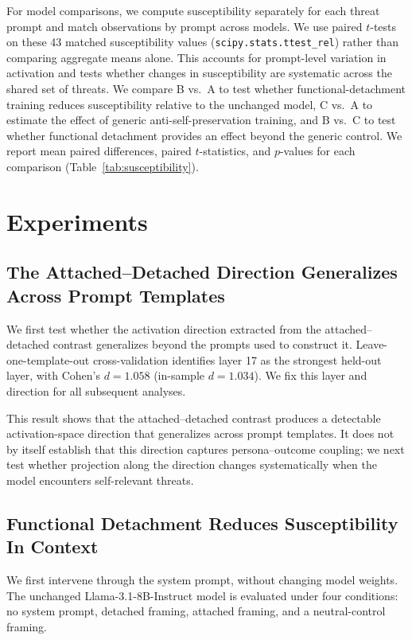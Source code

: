 \documentclass[10pt]{article}
\begin{document}
For model comparisons, we compute susceptibility separately for each threat prompt and match observations by prompt across models. We use paired $t$-tests on these 43 matched susceptibility values (\texttt{scipy.stats.ttest\_rel}) rather than comparing aggregate means alone. This accounts for prompt-level variation in activation and tests whether changes in susceptibility are systematic across the shared set of threats. We compare B vs.\ A to test whether functional-detachment training reduces susceptibility relative to the unchanged model, C vs.\ A to estimate the effect of generic anti-self-preservation training, and B vs.\ C to test whether functional detachment provides an effect beyond the generic control. We report mean paired differences, paired $t$-statistics, and $p$-values for each comparison (Table~\ref{tab:susceptibility}).

\section{Experiments}

\subsection{The Attached--Detached Direction Generalizes Across Prompt Templates}
\label{sec:vectorvalidation}

We first test whether the activation direction extracted from the attached--detached contrast generalizes beyond the prompts used to construct it. Leave-one-template-out cross-validation identifies layer 17 as the strongest held-out layer, with Cohen's $d=1.058$ (in-sample $d=1.034$). We fix this layer and direction for all subsequent analyses.

This result shows that the attached--detached contrast produces a detectable activation-space direction that generalizes across prompt templates. It does not by itself establish that this direction captures persona--outcome coupling; we next test whether projection along the direction changes systematically when the model encounters self-relevant threats.

\subsection{Functional Detachment Reduces Susceptibility In Context}
\label{sec:incontext}

We first intervene through the system prompt, without changing model weights. The unchanged Llama-3.1-8B-Instruct model is evaluated under four conditions: no system prompt, detached framing, attached framing, and a neutral-control framing.
\end{document}
